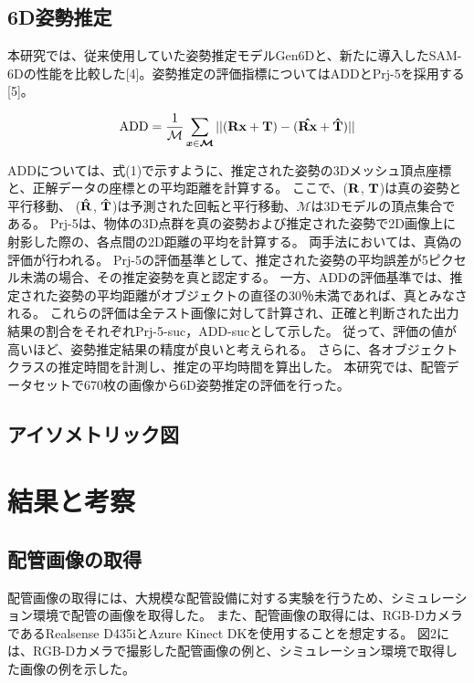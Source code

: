 \subsection{6D姿勢推定}
本研究では、従来使用していた姿勢推定モデルGen6Dと、新たに導入したSAM-6Dの性能を比較した[4]。姿勢推定の評価指標についてはADDとPrj-5を採用する[5]。

\begin{equation}
\textrm{ADD} = \frac{1}{\mathcal{M}}\sum_{\boldsymbol{x}\in \boldsymbol{\mathcal{M}}}||(\boldsymbol{\textrm{\textbf{Rx}}} + \boldsymbol{\textrm{\textbf{\textbf{T}}}}) - (\boldsymbol{\hat{\textrm{\textbf{Rx}}}} +  \boldsymbol{\hat{\textrm{\textbf{T}}}})||
\end{equation}

ADDについては、式(1)で示すように、推定された姿勢の3Dメッシュ頂点座標と、正解データの座標との平均距離を計算する。
ここで、($\boldsymbol{\textrm{\textbf{R}}}$, $\boldsymbol{\textrm{\textbf{T}}}$)は真の姿勢と平行移動、 ($\boldsymbol{\hat{\textrm{\textbf{R}}}}$, $\boldsymbol{\hat{\textrm{\textbf{T}}}}$)は予測された回転と平行移動、$\boldsymbol{\mathcal{M}}$は3Dモデルの頂点集合である。
Prj-5は、物体の3D点群を真の姿勢および推定された姿勢で2D画像上に射影した際の、各点間の2D距離の平均を計算する。
両手法においては、真偽の評価が行われる。
Prj-5の評価基準として、推定された姿勢の平均誤差が5ピクセル未満の場合、その推定姿勢を真と認定する。
一方、ADDの評価基準では、推定された姿勢の平均距離がオブジェクトの直径の30％未満であれば、真とみなされる。
これらの評価は全テスト画像に対して計算され、正確と判断された出力結果の割合をそれぞれPrj-5-suc，ADD-sucとして示した。
従って、評価の値が高いほど、姿勢推定結果の精度が良いと考えられる。
さらに、各オブジェクトクラスの推定時間を計測し、推定の平均時間を算出した。
本研究では、配管データセットで670枚の画像から6D姿勢推定の評価を行った。

\subsection{アイソメトリック図}



\section{結果と考察}

\subsection{配管画像の取得}
配管画像の取得には、大規模な配管設備に対する実験を行うため、シミュレーション環境で配管の画像を取得した。
また、配管画像の取得には、RGB-DカメラであるRealsense D435iとAzure Kinect DKを使用することを想定する。
図2には、RGB-Dカメラで撮影した配管画像の例と、シミュレーション環境で取得した画像の例を示した。

